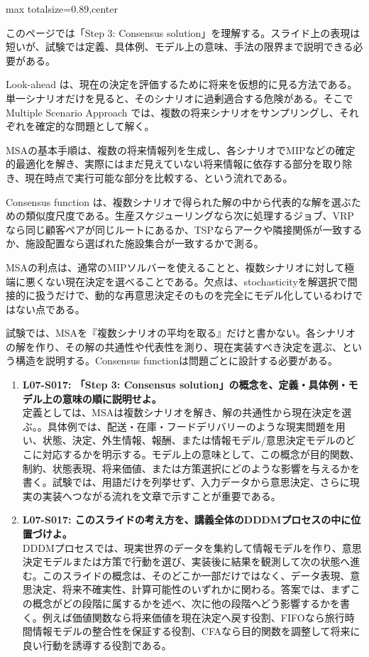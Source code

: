 \begin{minipage}[t]{0.58\textwidth}
\begin{adjustbox}{max totalsize={\textwidth}{0.89\textheight},center}
\begin{minipage}{\textwidth}\scriptsize
{}このページでは「Step 3: Consensus solution」を理解する。スライド上の表現は短いが、試験では定義、具体例、モデル上の意味、手法の限界まで説明できる必要がある。\par
Look-ahead は、現在の決定を評価するために将来を仮想的に見る方法である。単一シナリオだけを見ると、そのシナリオに過剰適合する危険がある。そこで Multiple Scenario Approach では、複数の将来シナリオをサンプリングし、それぞれを確定的な問題として解く。\par
MSAの基本手順は、複数の将来情報列を生成し、各シナリオでMIPなどの確定的最適化を解き、実際にはまだ見えていない将来情報に依存する部分を取り除き、現在時点で実行可能な部分を比較する、という流れである。\par
Consensus function は、複数シナリオで得られた解の中から代表的な解を選ぶための類似度尺度である。生産スケジューリングなら次に処理するジョブ、VRPなら同じ顧客ペアが同じルートにあるか、TSPならアークや隣接関係が一致するか、施設配置なら選ばれた施設集合が一致するかで測る。\par
MSAの利点は、通常のMIPソルバーを使えることと、複数シナリオに対して極端に悪くない現在決定を選べることである。欠点は、stochasticityを解選択で間接的に扱うだけで、動的な再意思決定そのものを完全にモデル化しているわけではない点である。\par
試験では、MSAを『複数シナリオの平均を取る』だけと書かない。各シナリオの解を作り、その解の共通性や代表性を測り、現在実装すべき決定を選ぶ、という構造を説明する。Consensus functionは問題ごとに設計する必要がある。\par{}\begin{enumerate}\item \textbf{L07-S017: 「Step 3: Consensus solution」の概念を、定義・具体例・モデル上の意味の順に説明せよ。}\\定義としては、MSAは複数シナリオを解き、解の共通性から現在決定を選ぶ。。具体例では、配送・在庫・フードデリバリーのような現実問題を用い、状態、決定、外生情報、報酬、または情報モデル/意思決定モデルのどこに対応するかを明示する。モデル上の意味として、この概念が目的関数、制約、状態表現、将来価値、または方策選択にどのような影響を与えるかを書く。試験では、用語だけを列挙せず、入力データから意思決定、さらに現実の実装へつながる流れを文章で示すことが重要である。\item \textbf{L07-S017: このスライドの考え方を、講義全体のDDDMプロセスの中に位置づけよ。}\\DDDMプロセスでは、現実世界のデータを集約して情報モデルを作り、意思決定モデルまたは方策で行動を選び、実装後に結果を観測して次の状態へ進む。このスライドの概念は、そのどこか一部だけではなく、データ表現、意思決定、将来不確実性、計算可能性のいずれかに関わる。答案では、まずこの概念がどの段階に属するかを述べ、次に他の段階へどう影響するかを書く。例えば価値関数なら将来価値を現在決定へ戻す役割、FIFOなら旅行時間情報モデルの整合性を保証する役割、CFAなら目的関数を調整して将来に良い行動を誘導する役割である。\end{enumerate}

\end{minipage}
\end{adjustbox}
\end{minipage}
